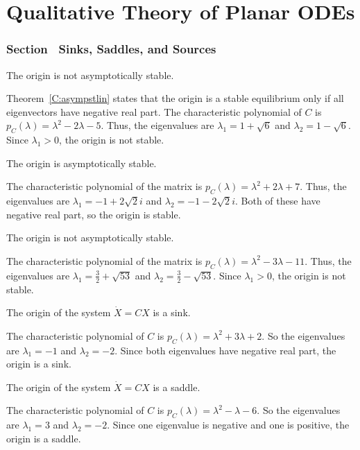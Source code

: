 \chapter{Qualitative Theory of Planar ODEs}

\subsection*{Section~\protect{\ref{S:6.7}} Sinks, Saddles, and Sources}

 \ans The origin is not asymptotically stable.

\soln Theorem~\ref{C:asympstlin} states that the origin is a stable
equilibrium only if all eigenvectors have negative real part.  The
characteristic polynomial of $C$ is $p_C(\lambda) = \lambda^2 - 2\lambda
- 5$.  Thus, the eigenvalues are $\lambda_1 = 1 + \sqrt{6}$ and
$\lambda_2 = 1 - \sqrt{6}$. Since $\lambda_1 > 0$, the origin
is not stable.

 \ans The origin is asymptotically stable.

\soln The characteristic polynomial of the matrix is $p_C(\lambda) =
\lambda^2 + 2\lambda + 7$.  Thus, the eigenvalues are $\lambda_1 =
-1 + 2\sqrt{2}i$ and $\lambda_2 = -1 - 2\sqrt{2}i$.  Both of these
have negative real part, so the origin is stable.

 \ans The origin is not asymptotically stable.

\soln The characteristic polynomial of the matrix is $p_C(\lambda) =
\lambda^2 - 3\lambda - 11$.  Thus, the eigenvalues are $\lambda_1 =
\frac{3}{2} + \sqrt{53}$ and $\lambda_2 = \frac{3}{2} - \sqrt{53}$.
Since $\lambda_1 > 0$, the origin is not stable.

 \ans The origin of the system $\dot{X} = CX$ is a sink.

\soln The characteristic polynomial of $C$ is
$p_C(\lambda) = \lambda^2 + 3\lambda + 2$.  So the eigenvalues are
$\lambda_1 = -1$ and $\lambda_2 = -2$.  Since both eigenvalues have
negative real part, the origin is a sink.

 \ans The origin of the system $\dot{X} = CX$ is a saddle.

\soln The characteristic polynomial of $C$ is
$p_C(\lambda) = \lambda^2 - \lambda - 6$.  So the eigenvalues are
$\lambda_1 = 3$ and $\lambda_2 = -2$.  Since one eigenvalue is negative
and one is positive, the origin is a saddle.

